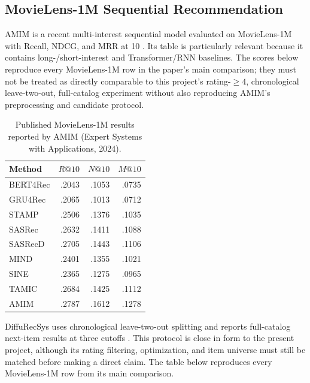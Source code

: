 \subsection{MovieLens-1M Sequential Recommendation}

AMIM is a recent multi-interest sequential model evaluated on MovieLens-1M
with Recall, NDCG, and MRR at 10 \cite{AMIM}. Its table is particularly relevant
because it contains long-/short-interest and Transformer/RNN baselines. The
scores below reproduce every MovieLens-1M row in the paper's main comparison;
they must not be treated as directly comparable to this project's
rating-$\geq4$, chronological leave-two-out, full-catalog experiment without
also reproducing AMIM's preprocessing and candidate protocol.

\begin{table}[H]
\centering
\caption{Published MovieLens-1M results reported by AMIM (Expert Systems with
Applications, 2024).}
\label{tab:amim-ml1m}
\begin{tabular}{@{}lrrr@{}}
\toprule
Method & $R@10$ & $N@10$ & $M@10$ \\
\midrule
BERT4Rec & .2043 & .1053 & .0735 \\
GRU4Rec & .2065 & .1013 & .0712 \\
STAMP & .2506 & .1376 & .1035 \\
SASRec & .2632 & .1411 & .1088 \\
SASRecD & .2705 & .1443 & .1106 \\
MIND & .2401 & .1355 & .1021 \\
SINE & .2365 & .1275 & .0965 \\
TAMIC & .2684 & .1425 & .1112 \\
AMIM & .2787 & .1612 & .1278 \\
\bottomrule
\end{tabular}
\end{table}

DiffuRecSys uses chronological leave-two-out splitting and reports full-catalog
next-item results at three cutoffs \cite{DIFFURECSYS}. This protocol is close in
form to the present project, although its rating filtering, optimization, and
item universe must still be matched before making a direct claim. The table
below reproduces every MovieLens-1M row from its main comparison.

